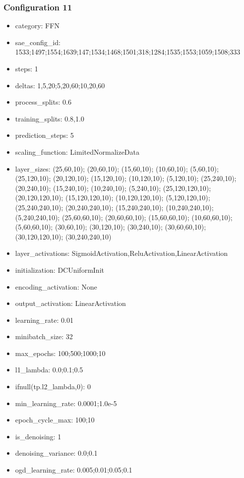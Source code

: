 \documentclass[a4paper,11pt,oneside]{article}
\theoremstyle{plain}
\theoremstyle{definition}
\begin{document}
\subsubsection{Configuration 11}\label{config11}
\begin{itemize}
	\item category: FFN
	\item sae\_config\_id: 1533;1497;1554;1639;147;1534;1468;1501;318;1284;1535;1553;1059;1508;333
	\item steps: 1
	\item deltas: 1,5,20;5,20,60;10,20,60
	\item process\_splits: 0.6
	\item training\_splits: 0.8,1.0
	\item prediction\_steps: 5
	\item scaling\_function: LimitedNormalizeData
	\item layer\_sizes: (25,60,10); (20,60,10); (15,60,10); (10,60,10); (5,60,10); (25,120,10); (20,120,10); (15,120,10); (10,120,10); (5,120,10); (25,240,10); (20,240,10); (15,240,10); (10,240,10); (5,240,10); (25,120,120,10); (20,120,120,10); (15,120,120,10); (10,120,120,10); (5,120,120,10); (25,240,240,10); (20,240,240,10); (15,240,240,10); (10,240,240,10); (5,240,240,10); (25,60,60,10); (20,60,60,10); (15,60,60,10); (10,60,60,10); (5,60,60,10); (30,60,10); (30,120,10); (30,240,10); (30,60,60,10); (30,120,120,10); (30,240,240,10)
	\item layer\_activations: SigmoidActivation,ReluActivation,LinearActivation
	\item initialization: DCUniformInit
	\item encoding\_activation: None
	\item output\_activation: LinearActivation
	\item learning\_rate: 0.01
	\item minibatch\_size: 32
	\item max\_epochs: 100;500;1000;10
	\item l1\_lambda: 0.0;0.1;0.5
	\item ifnull(tp.l2\_lambda,0): 0
	\item min\_learning\_rate: 0.0001;1.0e-5
	\item epoch\_cycle\_max: 100;10
	\item is\_denoising: 1
	\item denoising\_variance: 0.0;0.1
	\item ogd\_learning\_rate: 0.005;0.01;0.05;0.1
\end{itemize}
\end{document}
